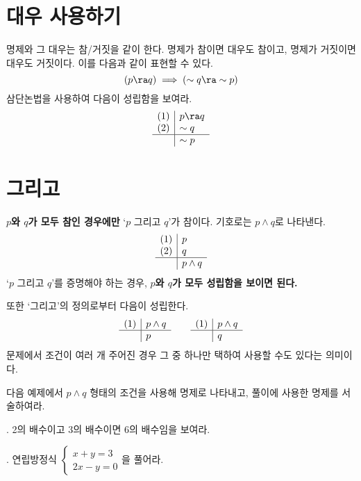 \section{대우 사용하기}

명제와 그 대우는 참/거짓을 같이 한다. 명제가 참이면 대우도 참이고, 명제가 거짓이면 대우도 거짓이다. 이를 다음과 같이 표현할 수 있다.
\[
    (p \ra q) \implies (\sim q \ra \sim p)
\]
삼단논법을 사용하여 다음이 성립함을 보여라.
\[
    \begin{array}{c|l}
        (1) & p \ra q \\ (2) & \sim q \\\hline & \sim p
    \end{array}
\]

\pagebreak

\section{그리고}

\textbf{\(p\)와 \(q\)가 모두 참인 경우에만} `\(p\) 그리고 \(q\)'가 참이다. 기호로는 \(p \wedge q\)로 나타낸다.
\[
    \begin{array}{c|l}
        (1) & p  \\ (2) & q \\\hline & p \wedge q
    \end{array}
\]
`\(p\) 그리고 \(q\)'를 증명해야 하는 경우, \textbf{\(p\)와 \(q\)가 모두 성립함을 보이면 된다.}

또한 `그리고'의 정의로부터 다음이 성립한다.
\[
    \begin{array}{c|l}
        (1) & p \wedge q \\\hline & p
    \end{array}
    \qquad
    \begin{array}{c|l}
        (1) & p \wedge q \\\hline & q
    \end{array}
\]
문제에서 조건이 여러 개 주어진 경우 그 중 하나만 택하여 사용할 수도 있다는 의미이다.

\bigskip

다음 예제에서 \(p \wedge q\) 형태의 조건을 사용해 명제로 나타내고, 풀이에 사용한 명제를 서술하여라.

\ex. 2의 배수이고 3의 배수이면 6의 배수임을 보여라.

\vspace*{180px}

\ex. 연립방정식 \(\begin{cases}
    x + y = 3 \\ 2x - y = 0
\end{cases}\)을 풀어라.

